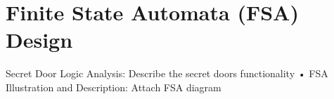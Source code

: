 \section{Finite State Automata (FSA) Design} \label{section: fsa design}
Secret Door Logic Analysis: Describe the secret doors functionality
• FSA Illustration and Description: Attach FSA diagram